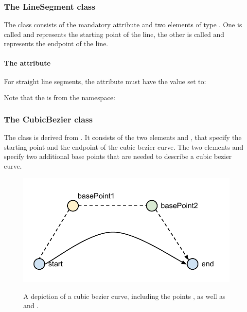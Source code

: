 \subsubsection{The LineSegment class} 
\label{linesegment-class} 

The \LineSegment class consists of the mandatory attribute 
 and two elements of type \Point. One is called 
 and represents the starting point of the line, the other 
is called  and represents the endpoint of the line. 

\paragraph {The  attribute} For straight line segments, 
the attribute  must have the value set to: 

\begin{center}
\end{center}

Note that the  is from the  namespace: 

\begin{center}
\end{center}

\subsubsection{The CubicBezier class}
\label{cubicbezier-class}
The class \CubicBezier is derived from \LineSegment. It consists of 
the two elements  and , that specify 
the starting point and the endpoint of the cubic bezier curve. The two 
elements  and  specify two 
additional base points that are needed to describe a cubic bezier curve. 

\begin{figure}[!h]
\includegraphics{figures/layout-cubic-bezier}\\
\label{figure:cubic-bezier}
\caption{A depiction of a cubic bezier curve, including the points ,  as well as  and .} 
\end{figure}



